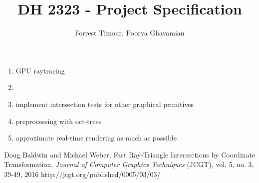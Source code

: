 \documentclass{article}
\title{DH 2323 - Project Specification}
\author{Forrest Timour, Poorya Ghavamian}
\begin{document}
\maketitle



\begin{enumerate}
\item GPU raytracing
\item 
\item implement intersection tests for other graphical primitives
\item preprocessing with oct-trees
\item approximate real-time rendering as much as possible
\end{enumerate}

\begin{thebibliography}{999}
Doug Baldwin and Michael Weber,
Fast Ray-Triangle Intersections by Coordinate Transformation,
\emph{Journal of Computer Graphics Techniques} (JCGT), vol. 5, no. 3, 39-49, 2016
http://jcgt.org/published/0005/03/03/

\end{thebibliography}
\end{document}
